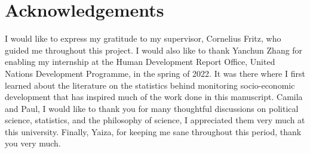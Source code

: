 \section*{Acknowledgements}

I would like to express my gratitude to my supervisor, Cornelius Fritz, who guided me throughout this project. I would also like to thank Yanchun Zhang for enabling my internship at the Human Development Report Office, United Nations Development Programme, in the spring of 2022. It was there where I first learned about the literature on the statistics behind monitoring socio-economic development that has inspired much of the work done in this manuscript. Camila and Paul, I would like to thank you for many thoughtful discussions on political science, statistics, and the philosophy of science, I appreciated them very much at this university. Finally, Yaiza, for keeping me sane throughout this period, thank you very much. 
